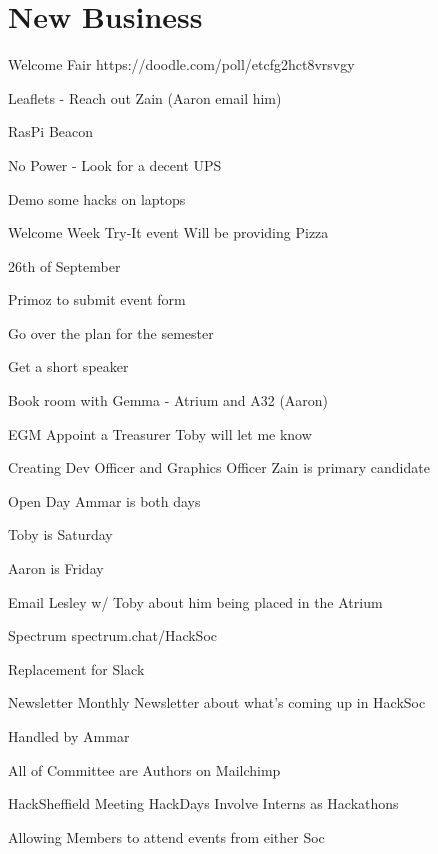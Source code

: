 \documentclass[11pt,hacksoc]{meetingmins}
\begin{document}
\section{New Business}
\begin{items}
	\item
	Welcome Fair
		\subitem
		https://doodle.com/poll/etcfg2hct8vrsvgy
		
		\subitem
		Leaflets - Reach out Zain (Aaron email him)
		
		\subitem
		RasPi Beacon
		
		\subitem
		No Power - Look for a decent UPS
		
		\subitem
		Demo some hacks on laptops
	
	\item
	Welcome Week
		\subitem
		Try-It event
			\subsubitem
			Will be providing Pizza
			
			\subsubitem
			26th of September
			
			\subsubitem
			Primoz to submit event form
			
			\subsubitem
			Go over the plan for the semester
			
			\subsubitem
			Get a short speaker
			
			\subsubitem
			Book room with Gemma - Atrium and A32 (Aaron)
			
	\item
	EGM
		\subitem
		Appoint a Treasurer
			\subsubitem
			Toby will let me know
		
		\subitem
		Creating Dev Officer and Graphics Officer
			\subsubitem
			Zain is primary candidate
	
	\item
	Open Day
		\subitem
		Ammar is both days
		
		\subitem
		Toby is Saturday
		
		\subitem
		Aaron is Friday
		
		\subitem
		Email Lesley w/ Toby about him being placed in the Atrium
	
	\item
	Spectrum
		\subitem
		spectrum.chat/HackSoc
		
		\subitem
		Replacement for Slack
	
	\item
	Newsletter
		\subitem
		Monthly Newsletter about what's coming up in HackSoc
		
		\subitem
		Handled by Ammar
		
		\subitem
		All of Committee are Authors on Mailchimp
	
	\item
	HackSheffield Meeting
		\subitem
		HackDays
			\subsubitem
			Involve Interns as Hackathons
			
		\subitem
			Allowing Members to attend events from either Soc
	
\end{items}

\vspace{1em}
\end{document}
